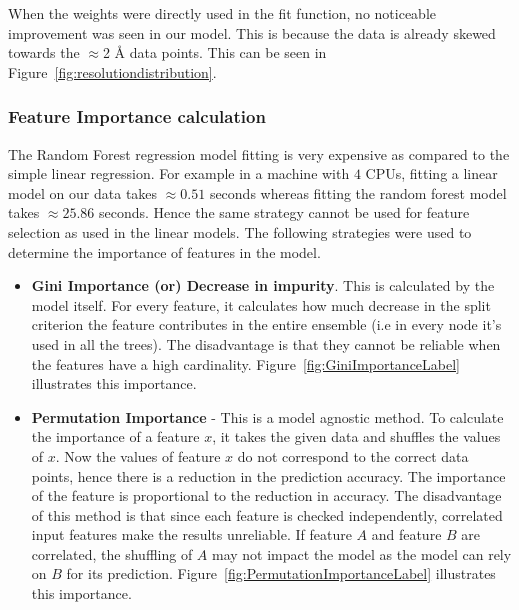 \documentclass[11pt]{article}
\begin{document}
When the weights were directly used in the fit function, no noticeable improvement was seen in our model.
This is because the data is already skewed towards the $\approx$2 \si{\angstrom}
data points.
This can be seen in Figure~\ref{fig:resolutiondistribution}.

\subsubsection{Feature Importance calculation}
The Random Forest regression model fitting is very expensive as compared to the simple linear regression.
For example in a machine with $4$ CPUs,  fitting a linear model on our data takes $\approx 0.51$ seconds whereas fitting the random forest model takes $\approx 25.86$ seconds.
Hence the same strategy cannot be used for feature selection as used in the linear models.
The following strategies were used to determine the importance of features in the model.

\begin{itemize}
\item \textbf{Gini Importance (or) Decrease in impurity}.  This is calculated by the model itself.
For every feature,  it calculates how much decrease in the split criterion the feature contributes in the entire ensemble (i.e in every node it's used in all the trees).
The disadvantage is that they cannot be reliable when the features have a high cardinality.  Figure~\ref{fig:GiniImportanceLabel} illustrates this importance.
\item \textbf{Permutation Importance} - This is a model agnostic method.
To calculate the importance of a feature $x$,  it takes the given data and shuffles the values of $x$.  Now the values of feature $x$ do not correspond to the correct data points,  hence there is a reduction in the prediction accuracy.
The importance of the feature is proportional to the reduction in accuracy.
The disadvantage of this method is that since each feature is checked independently,  correlated input features make the results unreliable. 
If feature $A$ and feature $B$ are correlated,  the shuffling of $A$ may not impact the model as the model can rely on $B$ for its prediction.  Figure~\ref{fig:PermutationImportanceLabel} illustrates this importance.
\end{itemize}
\end{document}
